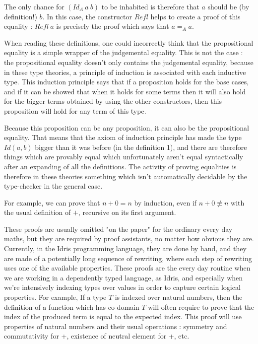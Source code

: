 The only chance for $(Id_A\ a\ b)$ to be inhabited is therefore that $a$ should be (by definition!) $b$. In this case, the constructor $Refl$ helps to create a proof of this equality : $Refl\ a$ is precisely the proof which says that $a=_Aa$. 

When reading these definitions, one could incorrectly think that the propositional equality is a simple wrapper of the judgemental equality. This is not the case : the propositional equality doesn't only contains the judgemental equality, because in these type theories, a principle of induction is associated with each inductive type. This induction principle says that if a proposition holds for the base cases, and if it can be showed that when it holds for some terms then it will also hold for the bigger terms obtained by using the other constructors, then this proposition will hold for any term of this type.

Because this proposition can be any proposition, it can also be the propositional equality. That means that the axiom of induction principle has made the type $Id(a,b)$ bigger than it was before (in the definition 1), and there are therefore things which are provably equal which unfortunately aren't equal syntactically after an expanding of all the definitions. The activity of proving equalities is therefore in these theories something which isn't automatically decidable by the type-checker in the general case.

For example, we can prove that $n+0 = n$ by induction, even if $n+0 \not\equiv n$ with the usual definition of $+$, recursive on its first argument. 

These proofs are usually omitted "on the paper" for the ordinary every day maths, but they are required by proof assistants, no matter how obvious they are. Currently, in the Idris programming language, they are done by hand, and they are made of a potentially long sequence of rewriting, where each step of rewriting uses one of the available properties. 
These proofs are the every day routine when we are working in a dependently typed language, as Idris, and especially when we're intensively indexing types over values in order to capture certain logical properties.
For example, If a type $T$ is indexed over natural numbers, then the definition of a function which has co-domain $T$ will often require to prove that the index of the produced term is equal to the expected index. This proof will use properties of natural numbers and their usual operations : symmetry and commutativity for +, existence of neutral element for +, etc.

